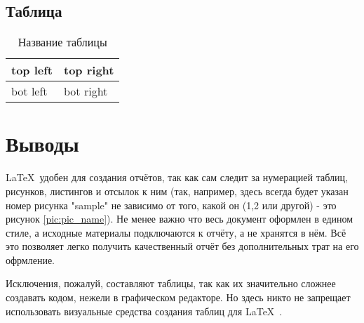 
\parindent=1cm

\subsection{Таблица}

\begin{table}[H]
	\caption{ Название таблицы}
	\begin{center}
		\begin{tabular}{|l|l|}
			\hline
			top left & top right\\ \hline
			bot left & bot right\\ \hline
		\end{tabular}
		\label{tabular:tab_examp}
	\end{center}
\end{table}

\section{Выводы}
\LaTeX\ удобен для создания отчётов, так как сам следит за нумерацией таблиц, рисунков, листингов и отсылок к ним (так, например, здесь всегда будет указан номер рисунка "sample" не зависимо от того, какой он (1,2 или другой) - это рисунок \ref{pic:pic_name}). Не менее важно что весь документ оформлен в едином стиле, а исходные материалы подключаются к отчёту, а не хранятся в нём. Всё это позволяет легко получить качественный отчёт без дополнительных трат на его офрмление.

Исключения, пожалуй, составляют таблицы, так как их значительно сложнее создавать кодом, нежели в графическом редакторе. Но здесь никто не запрещает использовать визуальные средства создания таблиц для \LaTeX\ .

